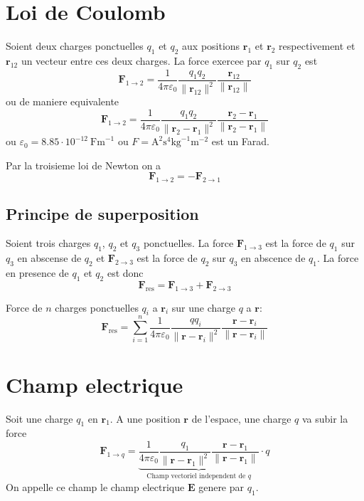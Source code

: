 \section{Loi de Coulomb}

Soient deux charges ponctuelles $q_{1}$ et $q_{2}$ aux positions $\boldsymbol{r}_{1}$ et $\boldsymbol{r}_{2}$ respectivement et $\boldsymbol{r}_{12}$ un vecteur entre ces deux charges. La force exercee par $q_{1}$ sur $q_{2}$ est 
$$
\boldsymbol{F}_{1\to 2}=\frac{1}{4\pi\varepsilon _{0}} \frac{q_{1}q_{2}}{\lVert \boldsymbol{r}_{12} \rVert ^{2}} \frac{\boldsymbol{r}_{12}}{\lVert \boldsymbol{r}_{12} \rVert }
$$
ou de maniere equivalente
$$
\boldsymbol{F}_{1\to 2}=\frac{1}{4\pi\varepsilon_{0}} \frac{q_{1}q_{2}}{\lVert \boldsymbol{r}_{2}-\boldsymbol{r}_{1} \rVert ^{2}} \frac{\boldsymbol{r}_{2}-\boldsymbol{r}_{1}}{\lVert \boldsymbol{r}_{2}-\boldsymbol{r}_{1} \rVert }
$$
ou $\varepsilon _{0}=8.85\cdot 10^{-12}~\mathrm{Fm}^{-1}$ ou $F=\mathrm{A}^{2}\mathrm{s}^{4}\mathrm{kg}^{-1}\mathrm{m}^{-2}$ est un Farad.

Par la troisieme loi de Newton on a
$$
\boldsymbol{F}_{1\to 2} =-\boldsymbol{F}_{2 \to 1}
$$
\subsection{Principe de superposition}

Soient trois charges $q_{1}$, $q_{2}$ et $q_{3}$ ponctuelles. La force $\boldsymbol{F}_{1 \to 3}$ est la force de $q_{1}$ sur $q_{3}$ en abscense de $q_{2}$ et $\boldsymbol{F}_{2\to 3}$ est la force de $q_{2}$ sur $q_{3}$ en abscence de $q_{1}$. La force en presence de $q_{1}$ et $q_{2}$ est donc
$$
\boldsymbol{F}_{\mathrm{res}}=\boldsymbol{F}_{1\to 3} +\boldsymbol{F}_{2\to 3}
$$

Force de $n$ charges ponctuelles $q_{i}$ a $\boldsymbol{r}_{i}$ sur une charge $q$ a $\boldsymbol{r}$:
$$
\boldsymbol{F}_{\mathrm{res}}=\sum_{i=1}^{n} \frac{1}{4\pi\varepsilon_{0}} \frac{qq_{i}}{\lVert \boldsymbol{r} -\boldsymbol{r}_{i}\rVert^{2}} \frac{\boldsymbol{r}-\boldsymbol{r}_{i}}{\lVert \boldsymbol{r}-\boldsymbol{r}_{i} \rVert }
$$
\section{Champ electrique}

Soit une charge $q_{1}$ en $\boldsymbol{r}_{1}$. A une position $\boldsymbol{r}$ de l'espace, une charge $q$ va subir la force
$$
\boldsymbol{F}_{1\to q} =\underbrace{ \frac{1}{4\pi\varepsilon_{0}} \frac{q_{1}}{\lVert \boldsymbol{r}-\boldsymbol{r}_{1} \rVert ^{2}} \frac{\boldsymbol{r}-\boldsymbol{r}_{1}}{\lVert \boldsymbol{r}-\boldsymbol{r}_{1} \rVert } }_{ \text{Champ vectoriel independent de }q } \cdot q
$$
On appelle ce champ le champ electrique $\boldsymbol{E}$ genere par $q_{1}$.

